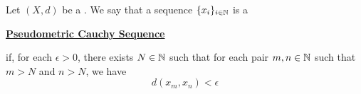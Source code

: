 \label{def:pseudometriccauchysequence}
\newcommand{\PseudometricCauchySequence}[0]{
    \bf \hyperref[def:pseudometriccauchysequence]{Pseudometric Cauchy Sequence} \rm
}
\begin{df}

    Let $(X,d)$ be a \PseudometricSpace.
    We say that a sequence 
	$\{x_i\}_{i \in \mathbb{N}}$ is a 
	\PseudometricCauchySequence
    if, for each 
	$\epsilon > 0$, 
	there exists
	$N \in \mathbb{N}$
	such that for 
    each pair 
	$m,n \in \mathbb{N}$ 
	such that 
	$m>N$ 
	and 
	$n>N$, we have 
    \begin{equation}
        d(x_m,x_n) < \epsilon
    \end{equation}
\end{df}

